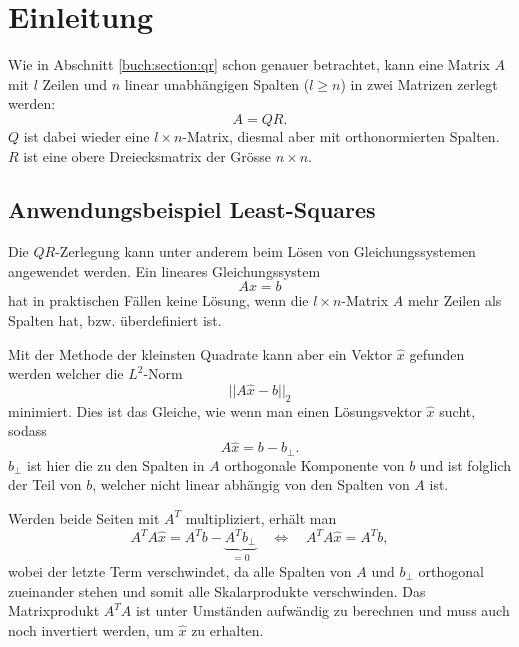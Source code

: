 %
%
%
\section{Einleitung\label{qr:section:einleitung}}
Wie in Abschnitt \ref{buch:section:qr} schon genauer betrachtet, kann eine Matrix $A$ mit $l$ Zeilen und $n$ linear unabhängigen Spalten ($l\ge n$) in zwei Matrizen zerlegt werden:
\begin{equation*}
A=QR.
\end{equation*}
$Q$ ist dabei wieder eine $l\times n$-Matrix, diesmal aber mit orthonormierten Spalten.
$R$ ist eine obere Dreiecksmatrix der Grösse $n\times n$.

\subsection{Anwendungsbeispiel Least-Squares\label{qr:section:ls}}
%
Die $QR$-Zerlegung kann unter anderem beim Lösen von Gleichungssystemen angewendet werden.
Ein lineares Gleichungssystem
\begin{equation}
Ax=b\label{qr:sle}
\end{equation}
hat in praktischen Fällen keine Lösung, wenn die $l\times n$-Matrix $A$ mehr Zeilen als Spalten hat, bzw. überdefiniert ist.

Mit der Methode der kleinsten Quadrate kann aber ein Vektor $\hat{x}$ gefunden werden welcher die $L^2$-Norm
%
%
\begin{equation*}
||A\hat{x}-b||_2
\end{equation*}
minimiert.
Dies ist das Gleiche, wie wenn man einen Lösungsvektor $\hat{x}$ sucht, sodass
\begin{equation*}
A\hat{x}=b-b_{\perp}.
\end{equation*}
$b_{\perp}$ ist hier die zu den Spalten in $A$ orthogonale Komponente von $b$ und ist folglich der Teil von $b$, welcher nicht linear abhängig von den Spalten von $A$ ist.

Werden beide Seiten mit $A^T$ multipliziert, erhält man
\begin{equation}
A^TA\hat{x}=A^Tb-\underbrace{A^Tb_{\perp}}_{\displaystyle=0}
\quad\Leftrightarrow\quad A^TA\hat{x}=A^Tb \label{qr:ls1},
\end{equation}
wobei der letzte Term verschwindet, da alle Spalten von $A$ und $b_{\perp}$ orthogonal zueinander stehen und somit alle Skalarprodukte verschwinden.
Das Matrixprodukt $A^TA$ ist unter Umständen aufwändig zu berechnen und muss auch noch invertiert werden, um $\hat{x}$ zu erhalten.


